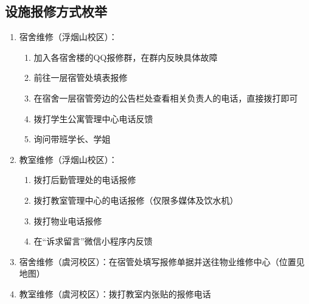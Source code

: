 \subsection[设施报修方式枚举]{设施报修方式枚举}
\label{repair_report}
\begin{enumerate}
    \item 宿舍维修（浮烟山校区）：
          \begin{enumerate}
              \item 加入各宿舍楼的QQ报修群，在群内反映具体故障
              \item 前往一层宿管处填表报修
              \item 在宿舍一层宿管旁边的公告栏处查看相关负责人的电话，直接拨打即可
              \item 拨打学生公寓管理中心电话反馈
              \item 询问带班学长、学姐
          \end{enumerate}
    \item 教室维修（浮烟山校区）：
          \begin{enumerate}
              \item 拨打后勤管理处的电话报修
              \item 拨打教室管理中心的电话报修（仅限多媒体及饮水机）
              \item 拨打物业电话报修
              \item 在“诉求留言”微信小程序内反馈
          \end{enumerate}
    \item 宿舍维修（虞河校区）：在宿管处填写报修单据并送往物业维修中心（位置见地图）
    \item 教室维修（虞河校区）：拨打教室内张贴的报修电话
\end{enumerate}

